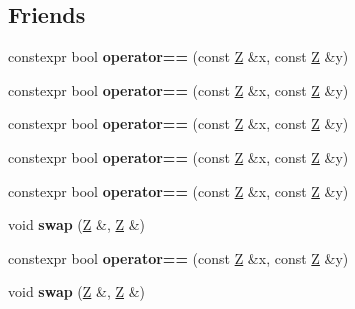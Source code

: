 \subsection*{Friends}
\begin{DoxyCompactItemize}
\item 
\mbox{\label{struct_z_ac0a03efad45091ee639b923e06ee3afd}} 
constexpr bool {\bfseries operator==} (const \mbox{\hyperlink{struct_z}{Z}} \&x, const \mbox{\hyperlink{struct_z}{Z}} \&y)
\item 
\mbox{\label{struct_z_ac0a03efad45091ee639b923e06ee3afd}} 
constexpr bool {\bfseries operator==} (const \mbox{\hyperlink{struct_z}{Z}} \&x, const \mbox{\hyperlink{struct_z}{Z}} \&y)
\item 
\mbox{\label{struct_z_ac0a03efad45091ee639b923e06ee3afd}} 
constexpr bool {\bfseries operator==} (const \mbox{\hyperlink{struct_z}{Z}} \&x, const \mbox{\hyperlink{struct_z}{Z}} \&y)
\item 
\mbox{\label{struct_z_ac0a03efad45091ee639b923e06ee3afd}} 
constexpr bool {\bfseries operator==} (const \mbox{\hyperlink{struct_z}{Z}} \&x, const \mbox{\hyperlink{struct_z}{Z}} \&y)
\item 
\mbox{\label{struct_z_ac0a03efad45091ee639b923e06ee3afd}} 
constexpr bool {\bfseries operator==} (const \mbox{\hyperlink{struct_z}{Z}} \&x, const \mbox{\hyperlink{struct_z}{Z}} \&y)
\item 
\mbox{\label{struct_z_a15c146725876915cf3a93c9ad062a3e4}} 
void {\bfseries swap} (\mbox{\hyperlink{struct_z}{Z}} \&, \mbox{\hyperlink{struct_z}{Z}} \&)
\item 
\mbox{\label{struct_z_ac0a03efad45091ee639b923e06ee3afd}} 
constexpr bool {\bfseries operator==} (const \mbox{\hyperlink{struct_z}{Z}} \&x, const \mbox{\hyperlink{struct_z}{Z}} \&y)
\item 
\mbox{\label{struct_z_a15c146725876915cf3a93c9ad062a3e4}} 
void {\bfseries swap} (\mbox{\hyperlink{struct_z}{Z}} \&, \mbox{\hyperlink{struct_z}{Z}} \&)
\item 
\mbox{\label{struct_z_a9fd020f7e3f83a01d3d1310aa4f27d0d}} 

\end{DoxyCompactItemize}
